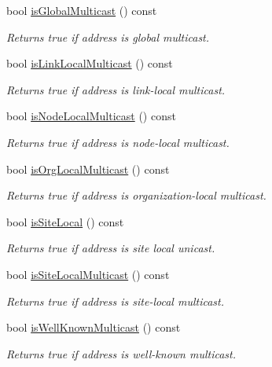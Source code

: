 \begin{DoxyCompactItemize}
bool \hyperlink{classostk_1_1io_1_1ip_1_1_address_a86687f373b37c64f4692465de5e96f26}{is\+Global\+Multicast} () const
\begin{DoxyCompactList}\small\item\em Returns true if address is global multicast. \end{DoxyCompactList}\item 
bool \hyperlink{classostk_1_1io_1_1ip_1_1_address_a90befc1694794a5608eb307715056d2d}{is\+Link\+Local\+Multicast} () const
\begin{DoxyCompactList}\small\item\em Returns true if address is link-\/local multicast. \end{DoxyCompactList}\item 
bool \hyperlink{classostk_1_1io_1_1ip_1_1_address_abc097099261de731a2478073b2cc14d9}{is\+Node\+Local\+Multicast} () const
\begin{DoxyCompactList}\small\item\em Returns true if address is node-\/local multicast. \end{DoxyCompactList}\item 
bool \hyperlink{classostk_1_1io_1_1ip_1_1_address_afcee80f65426fbe4118df48e13f3b3f9}{is\+Org\+Local\+Multicast} () const
\begin{DoxyCompactList}\small\item\em Returns true if address is organization-\/local multicast. \end{DoxyCompactList}\item 
bool \hyperlink{classostk_1_1io_1_1ip_1_1_address_a45d624593229bcba43e0724cd4a06c1f}{is\+Site\+Local} () const
\begin{DoxyCompactList}\small\item\em Returns true if address is site local unicast. \end{DoxyCompactList}\item 
bool \hyperlink{classostk_1_1io_1_1ip_1_1_address_a44e4d6cf1714b01dbb0d4b7042ad8366}{is\+Site\+Local\+Multicast} () const
\begin{DoxyCompactList}\small\item\em Returns true if address is site-\/local multicast. \end{DoxyCompactList}\item 
bool \hyperlink{classostk_1_1io_1_1ip_1_1_address_ac76c961e27406418258aa525f805b1e4}{is\+Well\+Known\+Multicast} () const
\begin{DoxyCompactList}\small\item\em Returns true if address is well-\/known multicast. \end{DoxyCompactList}\item 

\end{DoxyCompactItemize}
